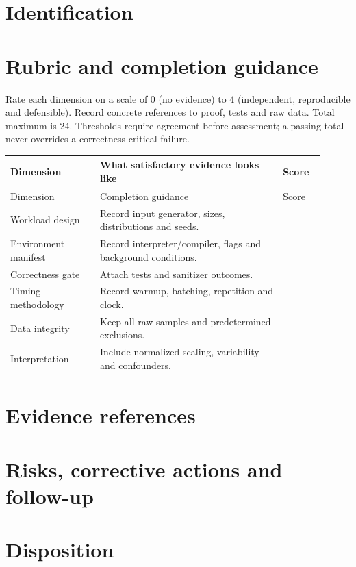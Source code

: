 \documentclass[11pt,letterpaper]{article}
\begin{document}
\tableofcontents
\clearpage
{}
\section{Identification}
\section{Rubric and completion guidance}
Rate each dimension on a scale of 0 (no evidence) to 4 (independent, reproducible and defensible). Record concrete references to proof, tests and raw data. Total maximum is 24. Thresholds require agreement before assessment; a passing total never overrides a correctness-critical failure.
\small
\begin{longtable}{@{}p{0.26\linewidth}p{0.53\linewidth}p{0.12\linewidth}@{}}\toprule Dimension & What satisfactory evidence looks like & Score\\\midrule\endfirsthead\toprule Dimension & Completion guidance & Score\\\midrule\endhead
Workload design & Record input generator, sizes, distributions and seeds. & \\[1.0em]
Environment manifest & Record interpreter/compiler, flags and background conditions. & \\[1.0em]
Correctness gate & Attach tests and sanitizer outcomes. & \\[1.0em]
Timing methodology & Record warmup, batching, repetition and clock. & \\[1.0em]
Data integrity & Keep all raw samples and predetermined exclusions. & \\[1.0em]
Interpretation & Include normalized scaling, variability and confounders. & \\[1.0em]
\bottomrule\end{longtable}
\normalsize\section{Evidence references}
\section{Risks, corrective actions and follow-up}
\section{Disposition}
\end{document}
